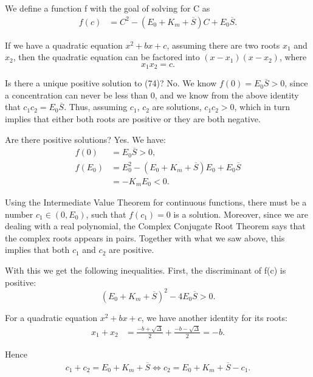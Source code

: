 \documentclass[12pt]{article}
\begin{document}
We define a function f with the goal of solving for C as
\begin{align}
  f(c) &= C^2 - (E_0 + K_m + \overline{S})C + E_0 \overline{S}.
\end{align}

If we have a quadratic equation $x^2+bx+c$, assuming there are two
roots $x_1$ and $x_2$, then the quadratic equation can be factored
into $(x - x_1)(x - x_2)$, where
\begin{equation}
  x_1 x_2 = c.
\end{equation}

Is there a unique positive solution to (74)? No. We know $f(0) = E_0
\overline{S} > 0$, since a concentration can never be less than 0, and
we know from the above identity that $c_1 c_2 = E_0
\overline{S}$. Thus, assuming $c_1$, $c_2$ are solutions, $c_1 c_2 >
0$, which in turn implies that either both roots are positive or they
are both negative.

Are there positive solutions? Yes. We have:
\begin{align}
  f(0) &= E_0 \overline{S} > 0, \\
  f(E_0) &= E_0^2 - (E_0 + K_m + \overline{S})E_0 + E_0 \overline{S} \\
         &= - K_m E_0 < 0.
\end{align}

Using the Intermediate Value Theorem for continuous functions, there
must be a number $c_1 \in (0,E_0)$, such that $f(c_1) = 0$ is a
solution. Moreover, since we are dealing with a real polynomial, the
Complex Conjugate Root Theorem says that the complex roots appears in
pairs. Together with what we saw above, this implies that both $c_1$
and $c_2$ are positive.

With this we get the following inequalities. First, the discriminant
of f(c) is positive:
\begin{equation}
  (E_0 + K_m + \overline{S})^2 - 4 E_0 \overline{S} > 0.
\end{equation}

For a quadratic equation $x^2 + bx + c$, we have another identity for
its roots:
\begin{align}
  x_1 + x_2 &= \frac{-b + \sqrt{\Delta}}{2} + \frac{-b - \sqrt{\Delta}}{2} = -b.
\end{align}

Hence
\begin{align}
  c_1 + c_2 = E_0 + K_m + \overline{S} \iff c_2 = E_0 + K_m + \overline{S} - c_1.
\end{align}
\end{document}
